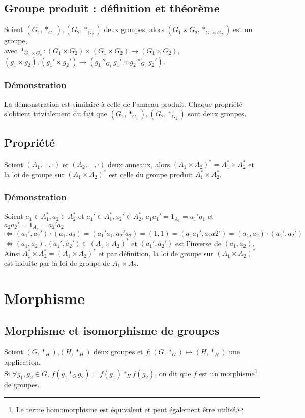 \documentclass[a4paper,10pt]{book} %
\begin{document}
\subsection{Groupe produit : définition et théorème}
Soient $(G_1,*_{G_1}),(G_2,*_{G_2})$ deux groupes, alors $(G_1\times G_2,*_{G_1\times G_2})$ est un groupe,\\avec $*_{G_1\times G_2} : (G_1\times G_2)\times (G_1\times G_2)\rightarrow (G_1\times G_2)$,
$(g_1\times g_2),(g_1'\times g_2')\rightarrow (g_1*_{G_1}g_1'\times g_2*_{G_2}g_2')$.

\subsubsection{Démonstration}
La démonstration est similaire à celle de l'anneau produit. Chaque propriété s'obtient trivialement du fait que $(G_1,*_{G_1}),(G_2,*_{G_2})$ sont deux groupes.

\subsection{Propriété}
Soient $(A_1,+,\cdot)$ et $(A_2,+,\cdot)$ deux anneaux, alors $(A_1\times A_2)^*=A_1^*\times A_2^*$ et la loi de groupe sur $(A_1\times A_2)^*$ est celle du groupe produit $A_1^* \times A_2^*$.

\subsubsection{Démonstration}
Soient $a_1\in A_1^*, a_2\in A_2^*$ et $a_1'\in A_1^*, a_2'\in A_2^*$, $a_1a_1'=1_{A_1}=a_1'a_1$ et $a_2a_2'=1_{A_2}=a_2'a_2$\\
$\Leftrightarrow (a_1',a_2')\cdot (a_1,a_2)=(a_1'a_1,a_2'a_2)=(1,1)=(a_1a_1',a_2a2')=(a_1,a_2)\cdot(a_1',a_2')$\\ 
$\Leftrightarrow (a_1,a_2),(a_1',a_2')\in (A_1\times A_2)^*$ et $(a_1',a_2')$ est l'inverse de $(a_1,a_2)$.\\
Ainsi $A_1^*\times A_2^*=(A_1\times A_2)^*$ et par définition, la loi de groupe sur $(A_1\times A_2)^*$ est induite par la loi de groupe de $A_1\times A_2$.

\newpage

\section{Morphisme}
\subsection{Morphisme et isomorphisme de groupes}
Soient $(G,*_H)$,$(H,*_H)$ deux groupes et $f:(G,*_G)\mapsto (H,*_H)$ une application.\\
Si $\forall g_1,g_2\in G$, $f(g_1*_Gg_2)=f(g_1)*_Hf(g_2)$, on dit que $f$ est un morphisme\footnote{\label{Homomorphisme}Le terme homomorphisme est équivalent et peut également être utilisé.} de groupes.\\
\end{document}
